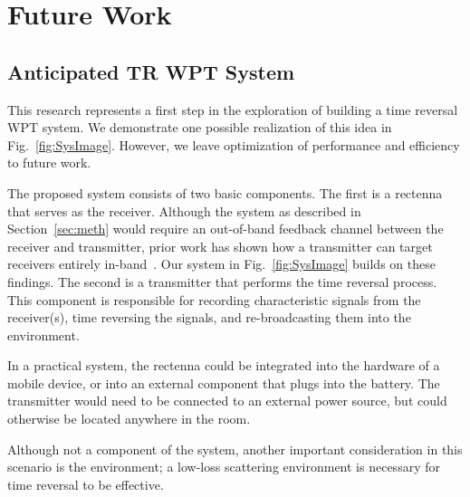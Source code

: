 \chapter{Future Work}
\label{ch:future}


\section{Anticipated TR WPT System}
\label{sec:future-roadmap}

This research represents a first step in the exploration of building a
time reversal WPT system.
%
We demonstrate one possible realization of this idea in Fig.~\ref{fig:SysImage}.
%
However, we leave optimization of performance and efficiency to future work.


The proposed system consists of two basic components.
%
The first is a rectenna that serves as the receiver.
%
Although the system as described in Section~\ref{sec:meth} would require an
out-of-band feedback channel between the receiver and transmitter, prior work
has shown how a transmitter can target receivers entirely
in-band~\cite{nltr-wave-chaotic,roman}.
%
Our system in Fig.~\ref{fig:SysImage} builds on these findings.
%
The second is a transmitter that performs the time reversal process.
%
This component is responsible for recording characteristic signals from the
receiver(s), time reversing the signals, and re-broadcasting them into the
environment.



In a practical system, the rectenna could be integrated into the hardware of a
mobile device, or into an external component that plugs into the battery.
%
The transmitter would need to be connected to an external power source, but
could otherwise be located anywhere in the room.


Although not a component of the system, another important consideration in this
scenario is the environment; a low-loss scattering environment is necessary for
time reversal to be effective.

